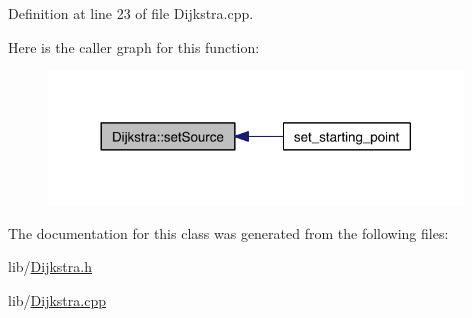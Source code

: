 Definition at line 23 of file Dijkstra.\-cpp.



Here is the caller graph for this function\-:
\nopagebreak
\begin{figure}[H]
\begin{center}
\leavevmode
\includegraphics[width=312pt]{class_dijkstra_a4a4d9e8545a192e43d4b3e7a13bde7fd_icgraph}
\end{center}
\end{figure}




The documentation for this class was generated from the following files\-:\begin{DoxyCompactItemize}
\item 
lib/\hyperlink{_dijkstra_8h}{Dijkstra.\-h}\item 
lib/\hyperlink{_dijkstra_8cpp}{Dijkstra.\-cpp}\end{DoxyCompactItemize}
